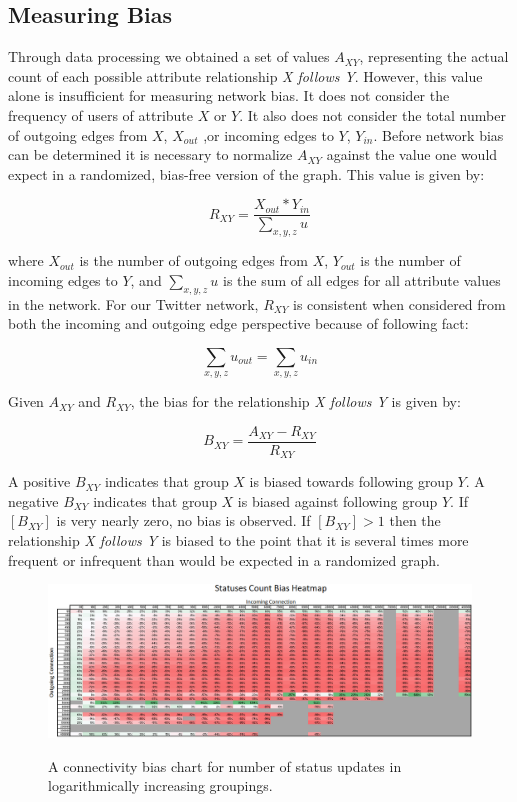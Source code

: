 \subsection{Measuring Bias}

Through data processing we obtained a set of values $A_{XY}$, representing the actual count of each possible attribute relationship \textit{X follows Y}.  However, this value alone is insufficient for measuring network bias.  It does not consider the frequency of users of attribute $X$ or $Y$.  It also does not consider the total number of outgoing edges from $X$, $X_{out}$ ,or incoming edges to $Y$, $Y_{in}$.  Before network bias can be determined it is necessary to normalize $A_{XY}$ against the value one would expect in a randomized, bias-free version of the graph.  This value is given by:

\[R_{XY} = \frac{X_{out}*Y_{in}}{\sum_{x,y,z}u}\]

where $X_{out}$ is the number of outgoing edges from $X$, $Y_{out}$ is the number of incoming edges to $Y$, and $\sum_{x,y,z}u$ is the sum of all edges for all attribute values in the network.  For our Twitter network, $R_{XY}$ is consistent when considered from both the incoming and outgoing edge perspective because of following fact:

\[\sum_{x,y,z}u_{out} = \sum_{x,y,z}u_{in}\]

Given $A_{XY}$ and $R_{XY}$, the bias for the relationship \textit{X follows Y} is given by:

\[B_{XY}=\frac{A_{XY}-R_{XY}}{R_{XY}}\]

A positive $B_{XY}$ indicates that group $X$ is biased towards following group $Y$.  A negative $B_{XY}$ indicates that group $X$ is biased against following group $Y$.  If $[B_{XY}]$ is very nearly zero, no bias is observed.  If $[B_{XY}] > 1$ then the relationship \textit{X follows Y} is biased to the point that it is several times more frequent or infrequent than would be expected in a randomized graph.

\begin{figure}[t]
 \centering
 \includegraphics[bb=0 0 1040 378,scale=.4]{./images/Bates-Final/statusescount.png}
 \label{fig:status_count}
 \caption{A connectivity bias chart for number of status updates in logarithmically increasing groupings.}
\end{figure}


